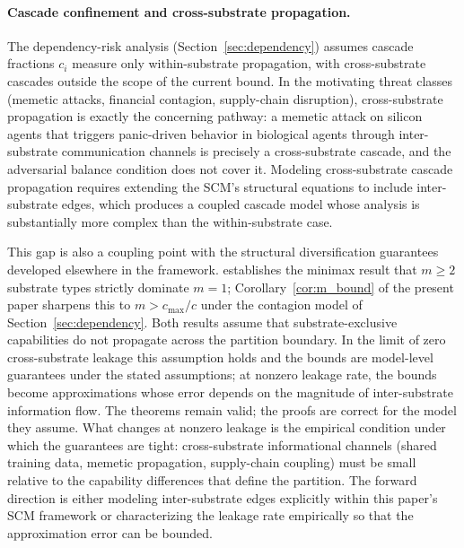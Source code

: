 \paragraph{Cascade confinement and cross-substrate propagation.}
The dependency-risk analysis (Section~\ref{sec:dependency}) assumes
cascade fractions $c_i$ measure only within-substrate propagation,
with cross-substrate cascades outside the scope of the current
bound. In the motivating threat classes (memetic attacks,
financial contagion, supply-chain disruption), cross-substrate
propagation is exactly the concerning pathway: a memetic attack on
silicon agents that triggers panic-driven behavior in biological
agents through inter-substrate communication channels is precisely a
cross-substrate cascade, and the adversarial balance condition does
not cover it. Modeling cross-substrate cascade propagation requires
extending the SCM's structural equations to include inter-substrate
edges, which produces a coupled cascade model whose analysis is
substantially more complex than the within-substrate case.

This gap is also a coupling point with the structural diversification
guarantees developed elsewhere in the framework.
\citet{lasser2026horizon} establishes the minimax result that
$m \geq 2$ substrate types strictly dominate $m = 1$;
Corollary~\ref{cor:m_bound} of the present paper sharpens this to
$m > c_{\max}/c$ under the contagion model of
Section~\ref{sec:dependency}. Both results assume that
substrate-exclusive capabilities do not propagate across the
partition boundary. In the limit of zero cross-substrate leakage
this assumption holds and the bounds are model-level guarantees
under the stated assumptions;
at nonzero leakage rate, the bounds become approximations whose
error depends on the magnitude of inter-substrate information flow.
The theorems remain valid; the proofs are correct for the model
they assume. What changes at nonzero leakage is the empirical condition
under which the guarantees are tight: cross-substrate informational
channels (shared training data, memetic propagation, supply-chain
coupling) must be small relative to the capability differences that
define the partition. The forward direction is either modeling
inter-substrate edges explicitly within this paper's SCM framework
or characterizing the leakage rate empirically so that the
approximation error can be bounded.

